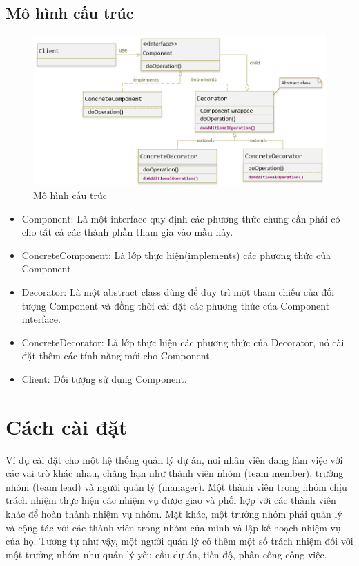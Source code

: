 \subsection{Mô hình cấu trúc}
\begin{figure}[!htb]
    \centering
    \includegraphics[width=\textwidth]{fig/Decorator/structure_decorator.png}
    \caption{Mô hình cấu trúc}
    \label{fig:structure_decorator}
\end{figure}
\newpage
\begin{itemize}
    \item Component: Là một interface quy định các phương thức chung cần phải có cho tất cả các thành phần tham gia vào mẫu này.
    \item ConcreteComponent: Là lớp thực hiện(implements) các phương thức của Component.
    \item Decorator: Là một abstract class dùng để duy trì một tham chiếu của đối tượng Component và đồng thời cài đặt các phương thức của Component  interface.
    \item ConcreteDecorator: Là lớp thực hiện các phương thức của Decorator, nó cài đặt thêm các tính năng mới cho Component.
    \item Client: Đối tượng sử dụng Component.
\end{itemize}

\section{Cách cài đặt}
Ví dụ cài đặt cho một hệ thống quản lý dự án, nơi nhân viên đang làm việc với các vai trò khác nhau, chẳng hạn như thành viên nhóm (team member), trưởng nhóm (team lead) và người quản lý (manager). Một thành viên trong nhóm chịu trách nhiệm thực hiện các nhiệm vụ được giao và phối hợp với các thành viên khác để hoàn thành nhiệm vụ nhóm. Mặt khác, một trưởng nhóm phải quản lý và cộng tác với các thành viên trong nhóm của mình và lập kế hoạch nhiệm vụ của họ. Tương tự như vậy, một người quản lý có thêm một số trách nhiệm đối với một trưởng nhóm như quản lý yêu cầu dự án, tiến độ, phân công công việc.

